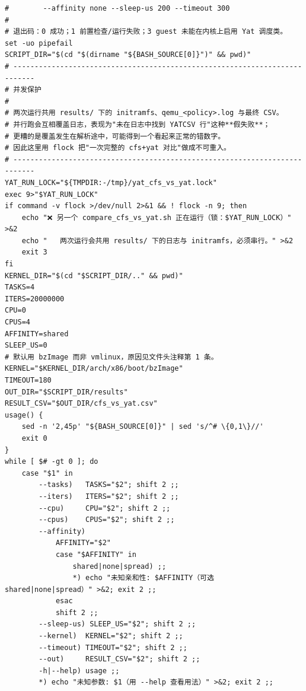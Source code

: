 \documentclass[10pt,a4paper]{article}
\newenvironment{yatpage}{\vspace*{0pt}}{\par}
\begin{document}
\newpage
\begin{yatpage}
\begin{Verbatim}[fontsize=\fontsize{8.2}{9.8}\selectfont]
#        --affinity none --sleep-us 200 --timeout 300
#
# 退出码：0 成功；1 前置检查/运行失败；3 guest 未能在内核上启用 Yat 调度类。
set -uo pipefail
SCRIPT_DIR="$(cd "$(dirname "${BASH_SOURCE[0]}")" && pwd)"
# ---------------------------------------------------------------------------
# 并发保护
#
# 两次运行共用 results/ 下的 initramfs、qemu_<policy>.log 与最终 CSV。
# 并行跑会互相覆盖日志，表现为"未在日志中找到 YATCSV 行"这种**假失败**；
# 更糟的是覆盖发生在解析途中，可能得到一个看起来正常的错数字。
# 因此这里用 flock 把"一次完整的 cfs+yat 对比"做成不可重入。
# ---------------------------------------------------------------------------
YAT_RUN_LOCK="${TMPDIR:-/tmp}/yat_cfs_vs_yat.lock"
exec 9>"$YAT_RUN_LOCK"
if command -v flock >/dev/null 2>&1 && ! flock -n 9; then
    echo "❌ 另一个 compare_cfs_vs_yat.sh 正在运行（锁：$YAT_RUN_LOCK）" >&2
    echo "   两次运行会共用 results/ 下的日志与 initramfs，必须串行。" >&2
    exit 3
fi
KERNEL_DIR="$(cd "$SCRIPT_DIR/.." && pwd)"
TASKS=4
ITERS=20000000
CPU=0
CPUS=4
AFFINITY=shared
SLEEP_US=0
# 默认用 bzImage 而非 vmlinux，原因见文件头注释第 1 条。
KERNEL="$KERNEL_DIR/arch/x86/boot/bzImage"
TIMEOUT=180
OUT_DIR="$SCRIPT_DIR/results"
RESULT_CSV="$OUT_DIR/cfs_vs_yat.csv"
usage() {
    sed -n '2,45p' "${BASH_SOURCE[0]}" | sed 's/^# \{0,1\}//'
    exit 0
}
while [ $# -gt 0 ]; do
    case "$1" in
        --tasks)   TASKS="$2"; shift 2 ;;
        --iters)   ITERS="$2"; shift 2 ;;
        --cpu)     CPU="$2"; shift 2 ;;
        --cpus)    CPUS="$2"; shift 2 ;;
        --affinity)
            AFFINITY="$2"
            case "$AFFINITY" in
                shared|none|spread) ;;
                *) echo "未知亲和性: $AFFINITY（可选 shared|none|spread）" >&2; exit 2 ;;
            esac
            shift 2 ;;
        --sleep-us) SLEEP_US="$2"; shift 2 ;;
        --kernel)  KERNEL="$2"; shift 2 ;;
        --timeout) TIMEOUT="$2"; shift 2 ;;
        --out)     RESULT_CSV="$2"; shift 2 ;;
        -h|--help) usage ;;
        *) echo "未知参数: $1（用 --help 查看用法）" >&2; exit 2 ;;
\end{Verbatim}
\end{yatpage}
\newpage
\end{document}
